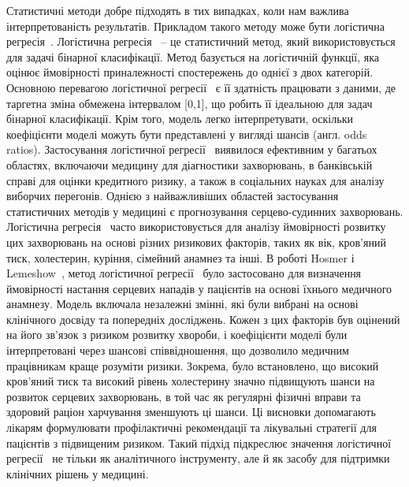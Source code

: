 Статистичні методи добре підходять в тих випадках, коли нам важлива інтерпретованість результатів. Прикладом такого методу може бути логістична регресія~\cite{ct1}. Логістична регресія~\cite{ct1} -- це статистичний метод, який використовується для задачі бінарної класифікації. Метод базується на логістичній функції, яка оцінює ймовірності приналежності спостережень до однієї з двох категорій. Основною перевагою логістичної регресії~\cite{ct1} є її здатність працювати з даними, де таргетна зміна обмежена інтервалом [0,1], що робить її ідеальною для задач бінарної класифікації. Крім того, модель легко інтерпретувати, оскільки коефіцієнти моделі можуть бути представлені у вигляді шансів (англ. odds ratios). Застосування логістичної регресії~\cite{ct1} виявилося ефективним у багатьох областях, включаючи медицину для діагностики захворювань, в банківській справі для оцінки кредитного ризику, а також в соціальних науках для аналізу виборчих перегонів. Однією з найважливіших областей застосування статистичних методів у медицині є прогнозування серцево-судинних захворювань. Логістична регресія~\cite{ct1} часто використовується для аналізу ймовірності розвитку цих захворювань на основі різних ризикових факторів, таких як вік, кров'яний тиск, холестерин, куріння, сімейний анамнез та інші. В роботі Hosmer і Lemeshow~\cite{ct12}, метод логістичної регресії~\cite{ct1} було застосовано для визначення ймовірності настання серцевих нападів у пацієнтів на основі їхнього медичного анамнезу. Модель включала незалежні змінні, які були вибрані на основі клінічного досвіду та попередніх досліджень. Кожен з цих факторів був оцінений на його зв'язок з ризиком розвитку хвороби, і коефіцієнти моделі були інтерпретовані через шансові співвідношення, що дозволило медичним працівникам краще розуміти ризики. Зокрема, було встановлено, що високий кров'яний тиск та високий рівень холестерину значно підвищують шанси на розвиток серцевих захворювань, в той час як регулярні фізичні вправи та здоровий раціон харчування зменшують ці шанси. Ці висновки допомагають лікарям формулювати профілактичні рекомендації та лікувальні стратегії для пацієнтів з підвищеним ризиком. Такий підхід підкреслює значення логістичної регресії~\cite{ct1} не тільки як аналітичного інструменту, але й як засобу для підтримки клінічних рішень у медицині.

